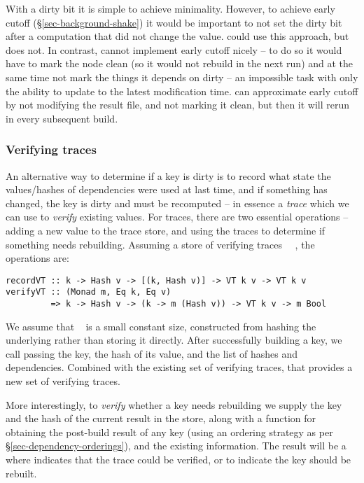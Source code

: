 With a dirty bit it is simple to achieve minimality. However, to achieve early cutoff
(\S\ref{sec-background-shake}) it would be important to not set the dirty bit
after a computation that did not change the value. \Excel could use this
approach, but does not. In contrast, \Make cannot implement early cutoff nicely -- to
do so it would have to mark the node clean (so it would not rebuild in the next
run) and at the same time not mark the things it depends on dirty -- an
impossible task with only the ability to update to the latest modification time.
\Make can approximate early cutoff by not modifying the result file, and not marking it clean,
but then it will rerun in every subsequent build.

\vspace{-2mm}
\subsubsection{Verifying traces}\label{sec-verifying-traces}

An alternative way to determine if a key is dirty is to record what state the
values/hashes of dependencies were used at last time, and if something has
changed, the key is dirty and must be recomputed -- in essence a \emph{trace}
which we can use to \emph{verify} existing values. For traces, there are two essential
operations -- adding a new value to the trace store, and using the traces to determine if something needs
rebuilding. Assuming a store of verifying traces ~~, the operations are:

\begin{verbatim}
recordVT :: k -> Hash v -> [(k, Hash v)] -> VT k v -> VT k v
verifyVT :: (Monad m, Eq k, Eq v)
         => k -> Hash v -> (k -> m (Hash v)) -> VT k v -> m Bool
\end{verbatim}

We assume that ~ is a small constant size, constructed from hashing the
underlying  rather than storing it directly. After successfully building a key, we call  passing the key, the hash of its value, and the list of hashes and dependencies. Combined with the existing set of verifying traces, that provides a new set of verifying traces.

More interestingly, to \emph{verify} whether a key needs rebuilding we supply the key and the hash of the current result in the store, along with a function for obtaining the post-build result of any key (using an ordering strategy
as per \S\ref{sec-dependency-orderings}), and the existing  information. The result will be a  where  indicates that the trace could be verified, or  to indicate the key should be rebuilt.


